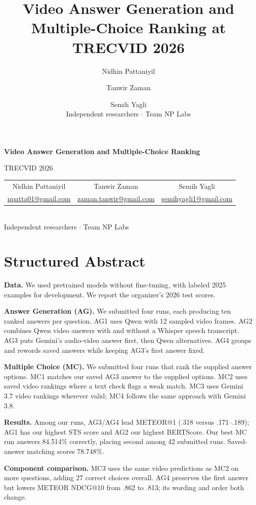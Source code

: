\documentclass[11pt,letterpaper]{article}
\title{Video Answer Generation and Multiple-Choice Ranking at TRECVID 2026}
\author{Nidhin Pattaniyil \and Tanwir Zaman \and Semih Yagli\\Independent researchers $\cdot$ Team NP Labs}
\date{}
\begin{document}
\begin{flushleft}
{\Large\bfseries Video Answer Generation and Multiple-Choice Ranking\par}
\vspace{4pt}
{\large TRECVID 2026\par}
\vspace{8pt}
\begin{center}
\begin{tabular}{ccc}
Nidhin Pattaniyil & Tanwir Zaman & Semih Yagli\\[2pt]
\footnotesize\href{mailto:npatta01@gmail.com}{\textcolor{evidenceblue}{npatta01@gmail.com}} &
\footnotesize\href{mailto:zaman.tanwir@gmail.com}{\textcolor{evidenceblue}{zaman.tanwir@gmail.com}} &
\footnotesize\href{mailto:semihyagli1@gmail.com}{\textcolor{evidenceblue}{semihyagli1@gmail.com}}
\end{tabular}\\[5pt]
{\small Independent researchers $\cdot$ Team NP Labs}
\end{center}
\end{flushleft}
\section*{Structured Abstract}
\textbf{Data.} We used pretrained models without fine-tuning, with labeled 2025 examples for development. We report the organizer's 2026 test scores.

\textbf{Answer Generation (AG).} We submitted four runs, each producing ten ranked answers per question. AG1 uses Qwen with 12 sampled video frames. AG2 combines Qwen video answers with and without a Whisper speech transcript. AG3 puts Gemini's audio-video answer first, then Qwen alternatives. AG4 groups and rewords saved answers while keeping AG3's first answer fixed.

\textbf{Multiple Choice (MC).} We submitted four runs that rank the supplied answer options. MC1 matches our saved AG3 answer to the supplied options. MC2 uses saved video rankings where a text check flags a weak match. MC3 uses Gemini 3.7 video rankings wherever valid; MC4 follows the same approach with Gemini 3.8.

\textbf{Results.} Among our runs, AG3/AG4 lead METEOR@1 (.318 versus .171--.189); AG1 has our highest STS score and AG2 our highest BERTScore. Our best MC run answers 84.514\% correctly, placing second among 42 submitted runs. Saved-answer matching scores 78.748\%.

\textbf{Component comparison.} MC3 uses the same video predictions as MC2 on more questions, adding 27 correct choices overall. AG4 preserves the first answer but lowers METEOR NDCG@10 from .862 to .813; its wording and order both change.
\end{document}
